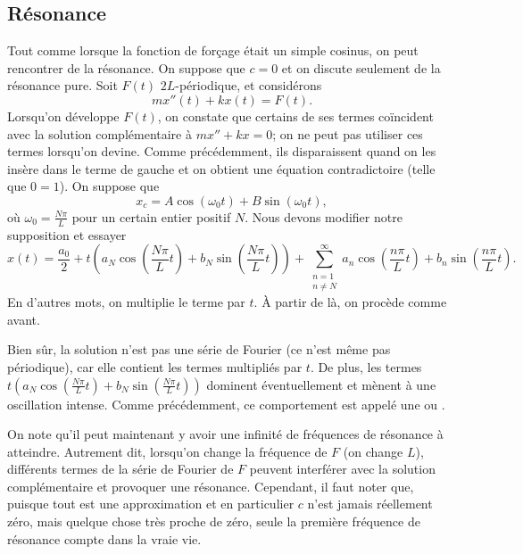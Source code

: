 \subsection{Résonance}

Tout comme lorsque la fonction de forçage était un simple cosinus, on peut rencontrer de la résonance. On suppose  que $ c = 0 $ et on discute seulement de la résonance pure.
Soit $ F (t) $ $ 2L $-périodique, et considérons
\begin{equation*}
m x''(t) + k x (t) = F(t) .
\end{equation*}
Lorsqu'on développe $ F (t) $, on constate que certains de ses termes coïncident avec la solution complémentaire à $ mx '' + kx = 0 $; on ne peut pas utiliser ces termes lorsqu'on devine. Comme précédemment, ils disparaissent quand on les insère dans le terme de gauche et on obtient une équation contradictoire (telle que $ 0 = 1 $). On suppose que
\begin{equation*}
x_c = A \cos (\omega_0 t) + B \sin (\omega_0 t), 
\end{equation*}
où $\omega_0 = \frac{N \pi}{L}$ pour un certain entier positif $N$.
Nous devons modifier notre supposition et essayer  
\begin{equation*}
x(t) = \frac{a_0}{2} +
t \left(
a_N \cos \left( \frac{N \pi}{L} t \right) +
b_N \sin \left( \frac{N \pi}{L} t \right) \right) +
\sum_{\substack{n=1\\n\not= N}}^\infty
a_n \cos \left( \frac{n \pi}{L} t \right) +
b_n \sin \left( \frac{n \pi}{L} t \right) .
\end{equation*}
En d'autres mots, on multiplie le terme par $ t $. À partir de là, on
procède comme avant.

Bien sûr, la solution n'est pas une série de Fourier (ce n'est même pas
périodique), car elle contient les termes multipliés par $ t $. De plus, les
termes
$t \left( a_N \cos \left( \frac{N \pi}{L} t \right) +
b_N \sin \left( \frac{N \pi}{L} t \right) \right)$ dominent éventuellement et mènent à une oscillation intense. Comme précédemment, ce comportement est appelé une \emph{} ou \emph{}.

On note qu'il peut maintenant y avoir une infinité de fréquences de résonance à atteindre.
Autrement dit, lorsqu'on change la fréquence de $ F $ (on change $ L $),  différents termes de la série de Fourier de $ F $ peuvent interférer avec la solution complémentaire et provoquer une résonance.
Cependant, il faut noter que, puisque tout est une approximation et en particulier $c$ n'est jamais réellement zéro, mais quelque chose très proche de zéro, seule la première fréquence de résonance compte dans la vraie vie.

